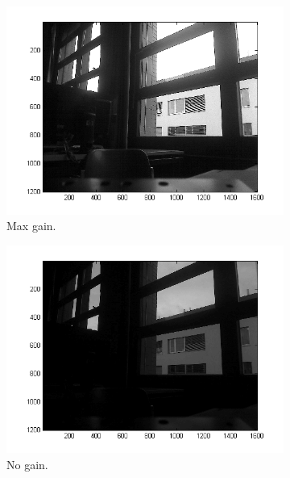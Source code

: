 \documentclass[a4paper, 12pt]{paper}
\begin{document}
\begin{figure}[H]
    \centering
    \begin{subfigure}[b]{0.32\textwidth}
        \includegraphics[width=\textwidth]{img/HDR_max_gain}
        \caption{Max gain.}
    \end{subfigure}
    \begin{subfigure}[b]{0.32\textwidth}
        \includegraphics[width=\textwidth]{img/HDR_no_gain}
        \caption{No gain.}
    \end{subfigure}
    \begin{subfigure}[b]{0.32\textwidth}

\end{subfigure}
\end{figure}
\end{document}
